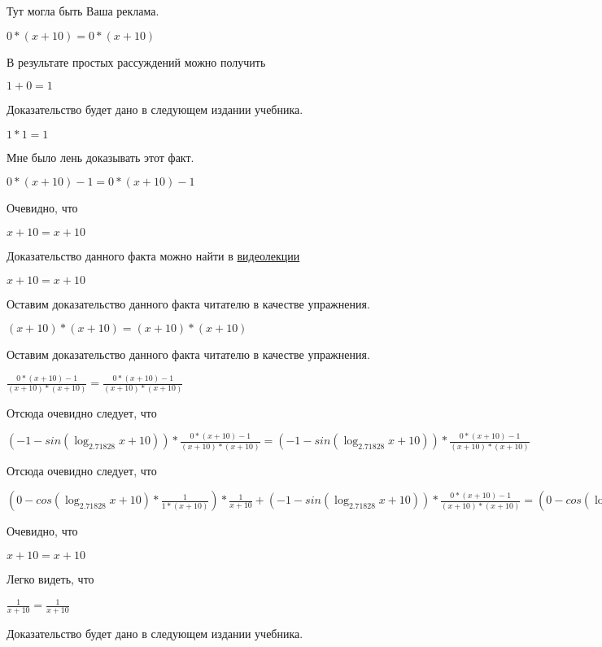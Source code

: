 \documentclass[12pt,a4paper,fleqn]{article}
\theoremstyle{definition}
\begin{document}
Тут могла быть Ваша реклама.

$ 0  * ( x  +  10 ) =  0  * ( x  +  10 )$

В результате простых рассуждений можно получить

$ 1  +  0  =  1 $

Доказательство будет дано в следующем издании учебника.

$ 1  *  1  =  1 $

Мне было лень доказывать этот факт.

$ 0  * ( x  +  10 ) -  1  =  0  * ( x  +  10 ) -  1 $

Очевидно, что

$ x  +  10  =  x  +  10 $

Доказательство данного факта можно найти в \href{https://www.youtube.com/watch?v=dQw4w9WgXcQ}{видеолекции}

$ x  +  10  =  x  +  10 $

Оставим доказательство данного факта читателю в качестве упражнения.

$( x  +  10 ) * ( x  +  10 ) = ( x  +  10 ) * ( x  +  10 )$

Оставим доказательство данного факта читателю в качестве упражнения.

$\frac{ 0  * ( x  +  10 ) -  1 }{( x  +  10 ) * ( x  +  10 )}
 = \frac{ 0  * ( x  +  10 ) -  1 }{( x  +  10 ) * ( x  +  10 )}
$

Отсюда очевидно следует, что

$( -1  - sin(\log_{ 2.71828 }{ x  +  10 })) * \frac{ 0  * ( x  +  10 ) -  1 }{( x  +  10 ) * ( x  +  10 )}
 = ( -1  - sin(\log_{ 2.71828 }{ x  +  10 })) * \frac{ 0  * ( x  +  10 ) -  1 }{( x  +  10 ) * ( x  +  10 )}
$

Отсюда очевидно следует, что

$( 0  - cos(\log_{ 2.71828 }{ x  +  10 }) * \frac{ 1 }{ 1  * ( x  +  10 )}
) * \frac{ 1 }{ x  +  10 }
 + ( -1  - sin(\log_{ 2.71828 }{ x  +  10 })) * \frac{ 0  * ( x  +  10 ) -  1 }{( x  +  10 ) * ( x  +  10 )}
 = ( 0  - cos(\log_{ 2.71828 }{ x  +  10 }) * \frac{ 1 }{ 1  * ( x  +  10 )}
) * \frac{ 1 }{ x  +  10 }
 + ( -1  - sin(\log_{ 2.71828 }{ x  +  10 })) * \frac{ 0  * ( x  +  10 ) -  1 }{( x  +  10 ) * ( x  +  10 )}
$

Очевидно, что

$ x  +  10  =  x  +  10 $

Легко видеть, что

$\frac{ 1 }{ x  +  10 }
 = \frac{ 1 }{ x  +  10 }
$

Доказательство будет дано в следующем издании учебника.
\end{document}
